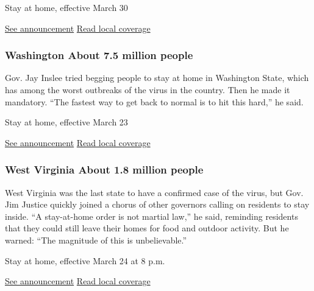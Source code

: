 Stay at home, effective March 30

\href{https://www.governor.virginia.gov/newsroom/all-releases/2020/march/headline-855702-en.html}{See
announcement} \textbar{}
\href{https://www.roanoke.com/news/virginia/gov-northam-to-issue-stay-at-home-order/article_b80fb621-1eca-57dd-b8e4-67c8a7dd8ebc.html}{Read
local coverage}

\hypertarget{washington-about-75-million-people}{%
\subsubsection{Washington About 7.5 million
people}\label{washington-about-75-million-people}}

Gov. Jay Inslee tried begging people to stay at home in Washington
State, which has among the worst outbreaks of the virus in the country.
Then he made it mandatory. ``The fastest way to get back to normal is to
hit this hard,'' he said.

Stay at home, effective March 23

\href{https://www.documentcloud.org/documents/6817957-20-25-Coronovirus-Stay-Safe-Stay-Healthy.html}{See
announcement} \textbar{}
\href{https://www.seattletimes.com/seattle-news/inslee-to-hold-televised-address-monday-evening-to-announce-enhanced-strategies-on-covid-19/}{Read
local coverage}

\hypertarget{west-virginia-about-18-million-people}{%
\subsubsection{West Virginia About 1.8 million
people}\label{west-virginia-about-18-million-people}}

West Virginia was the last state to have a confirmed case of the virus,
but Gov. Jim Justice quickly joined a chorus of other governors calling
on residents to stay inside. ``A stay-at-home order is not martial
law,'' he said, reminding residents that they could still leave their
homes for food and outdoor activity. But he warned: ``The magnitude of
this is unbelievable.''

Stay at home, effective March 24 at 8 p.m.

\href{https://dhhr.wv.gov/COVID-19/Pages/Governor-Issues-Stay-at-Home-Order.aspx}{See
announcement} \textbar{}
\href{https://www.wvgazettemail.com/coronavirus/justice-issues-stay-at-home-order-closes-non-essential-businesses/article_37bc0158-d9b4-5255-83d1-cc4dd57f409b.html}{Read
local coverage}

